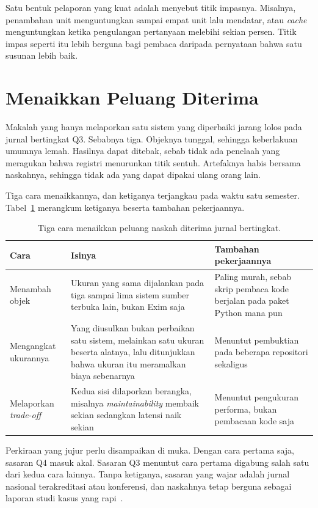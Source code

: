 Satu bentuk pelaporan yang kuat adalah menyebut titik impasnya. Misalnya,
penambahan unit menguntungkan sampai empat unit lalu mendatar, atau
\textit{cache} menguntungkan ketika pengulangan pertanyaan melebihi sekian
persen. Titik impas seperti itu lebih berguna bagi pembaca daripada pernyataan
bahwa satu susunan lebih baik.

\section{Menaikkan Peluang Diterima}

Makalah yang hanya melaporkan satu sistem yang diperbaiki jarang lolos pada
jurnal bertingkat Q3. Sebabnya tiga. Objeknya tunggal, sehingga keberlakuan
umumnya lemah. Hasilnya dapat ditebak, sebab tidak ada penelaah yang meragukan
bahwa registri menurunkan titik sentuh. Artefaknya habis bersama naskahnya,
sehingga tidak ada yang dapat dipakai ulang orang lain.

Tiga cara menaikkannya, dan ketiganya terjangkau pada waktu satu semester.
Tabel~\ref{tab:peluang} merangkum ketiganya beserta tambahan pekerjaannya.

\begin{table}[htbp]
  \centering
  \caption{Tiga cara menaikkan peluang naskah diterima jurnal bertingkat.}
  \label{tab:peluang}
  \begin{tabularx}{\textwidth}{|l|X|X|}
    \hline
    \textbf{Cara} & \textbf{Isinya} & \textbf{Tambahan pekerjaannya} \\
    \hline
    Menambah objek & Ukuran yang sama dijalankan pada tiga sampai lima sistem sumber terbuka lain, bukan Exim saja & Paling murah, sebab skrip pembaca kode berjalan pada paket Python mana pun \\
    \hline
    Mengangkat ukurannya & Yang diusulkan bukan perbaikan satu sistem, melainkan satu ukuran beserta alatnya, lalu ditunjukkan bahwa ukuran itu meramalkan biaya sebenarnya & Menuntut pembuktian pada beberapa repositori sekaligus \\
    \hline
    Melaporkan \textit{trade-off} & Kedua sisi dilaporkan berangka, misalnya \textit{maintainability} membaik sekian sedangkan latensi naik sekian & Menuntut pengukuran performa, bukan pembacaan kode saja \\
    \hline
  \end{tabularx}
\end{table}

Perkiraan yang jujur perlu disampaikan di muka. Dengan cara pertama saja,
sasaran Q4 masuk akal. Sasaran Q3 menuntut cara pertama digabung salah satu
dari kedua cara lainnya. Tanpa ketiganya, sasaran yang wajar adalah jurnal
nasional terakreditasi atau konferensi, dan naskahnya tetap berguna sebagai
laporan studi kasus yang rapi~\cite{runeson2009case}.

